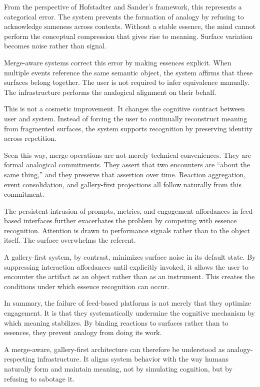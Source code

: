 \documentclass[11pt,oneside]{article}
\begin{document}
From the perspective of Hofstadter and Sander’s framework, this represents a categorical error. The system prevents the formation of analogy by refusing to acknowledge sameness across contexts. Without a stable essence, the mind cannot perform the conceptual compression that gives rise to meaning. Surface variation becomes noise rather than signal.

Merge-aware systems correct this error by making essences explicit. When multiple events reference the same semantic object, the system affirms that these surfaces belong together. The user is not required to infer equivalence manually. The infrastructure performs the analogical alignment on their behalf.

This is not a cosmetic improvement. It changes the cognitive contract between user and system. Instead of forcing the user to continually reconstruct meaning from fragmented surfaces, the system supports recognition by preserving identity across repetition.

Seen this way, merge operations are not merely technical conveniences. They are formal analogical commitments. They assert that two encounters are “about the same thing,” and they preserve that assertion over time. Reaction aggregation, event consolidation, and gallery-first projections all follow naturally from this commitment.

The persistent intrusion of prompts, metrics, and engagement affordances in feed-based interfaces further exacerbates the problem by competing with essence recognition. Attention is drawn to performance signals rather than to the object itself. The surface overwhelms the referent.

A gallery-first system, by contrast, minimizes surface noise in its default state. By suppressing interaction affordances until explicitly invoked, it allows the user to encounter the artifact as an object rather than as an instrument. This creates the conditions under which essence recognition can occur.

In summary, the failure of feed-based platforms is not merely that they optimize engagement. It is that they systematically undermine the cognitive mechanism by which meaning stabilizes. By binding reactions to surfaces rather than to essences, they prevent analogy from doing its work.

A merge-aware, gallery-first architecture can therefore be understood as analogy-respecting infrastructure. It aligns system behavior with the way humans naturally form and maintain meaning, not by simulating cognition, but by refusing to sabotage it.
\end{document}
